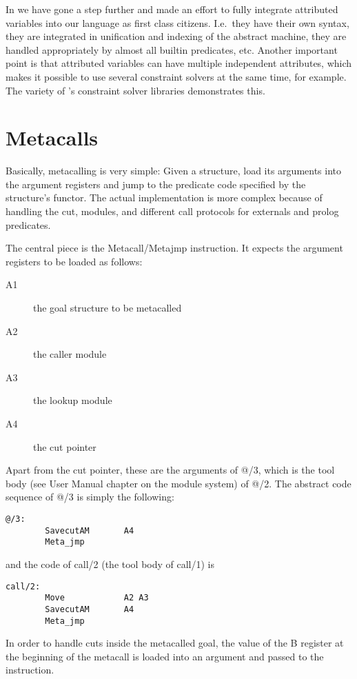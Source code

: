 In {\eclipse} we have gone a step further and made an effort to fully
integrate attributed variables into our language as first class citizens.
I.e.\ they have their own syntax, they are integrated in unification
and indexing of the abstract machine, they are handled appropriately
by almost all builtin predicates, etc. Another important point is that
{\eclipse} attributed variables can have multiple independent
attributes, which makes it possible to use several constraint solvers
at the same time, for example.  The variety of {\eclipse}'s constraint
solver libraries demonstrates this.



\section{Metacalls}
\label{secmetacall}

Basically, metacalling is very simple:  Given a structure, load its
arguments into the argument  registers and jump to the predicate code
specified by the structure's functor.  The actual implementation is
more complex because of handling the cut, modules, and different call
protocols for externals and prolog predicates.

The central piece is the Metacall/Metajmp instruction.
It expects the argument registers to be loaded as follows:
\begin{description}
\item[A1] the goal structure to be metacalled
\item[A2] the caller module
\item[A3] the lookup module
\item[A4] the cut pointer
\end{description}
Apart from the cut  pointer, these are the arguments of @/3, which is
the tool body (see User Manual chapter on the module system) of @/2.
The abstract code sequence of @/3 is simply the following:
\begin{verbatim}
@/3:
        SavecutAM       A4
        Meta_jmp
\end{verbatim}
and the code of call/2 (the tool body of call/1) is
\begin{verbatim}
call/2:
        Move            A2 A3
        SavecutAM       A4
        Meta_jmp
\end{verbatim}
In order to handle cuts inside the metacalled goal, the value of the B
register at the beginning of the metacall is loaded into an argument
and passed to the instruction.

